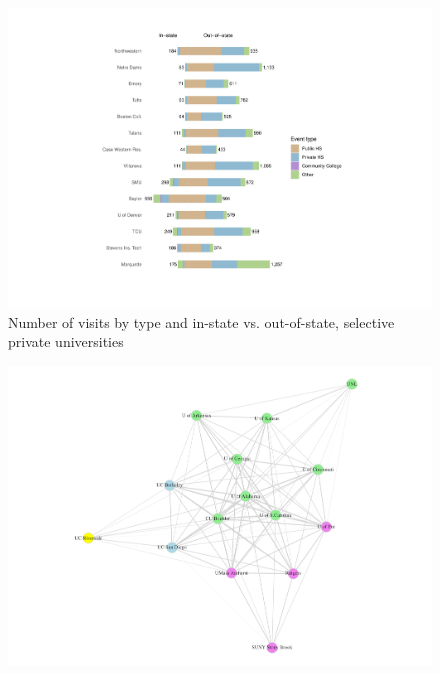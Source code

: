 \documentclass[
]{article}
\begin{document}
\begin{landscape}
\newpage

\begin{figure}

{\centering \includegraphics[width=2\linewidth]{../assets/figures/events_count_privu} 

}

\caption{Number of visits by type and in-state vs. out-of-state, selective private universities}\label{fig:events-count-privu}
\end{figure}

\newpage

\begin{figure}

{\centering \includegraphics[width=2\linewidth]{../assets/figures/plot_1mode_pubu} 

}


\end{figure}
\end{landscape}
\end{document}
